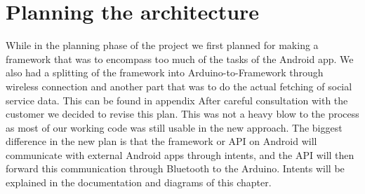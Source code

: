 \section{Planning the architecture}

While in the planning phase of the project we first planned for making a framework that was to encompass too much of the tasks of the Android app. We also had a splitting of the framework into Arduino-to-Framework through wireless connection and another part that was to do the actual fetching of social service data. This can be found in appendix %
After careful consultation with the customer we decided to revise this plan. This was not a heavy blow to the process as most of our working code was still usable in the new approach. The biggest difference in the new plan is that the framework or API on Android will communicate with external Android apps through intents, and the API will then forward this communication through Bluetooth to the Arduino. Intents will be explained in the documentation and diagrams of this chapter.

